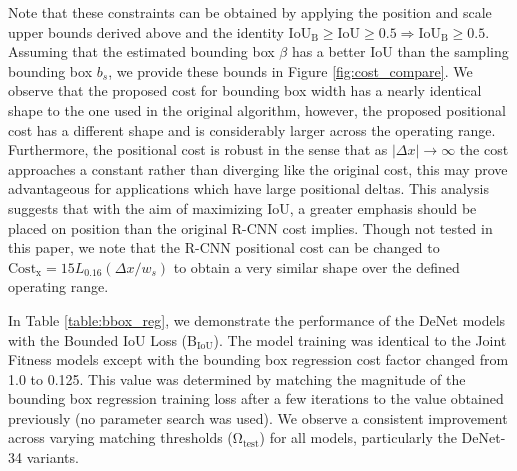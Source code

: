 \documentclass[10pt,twocolumn,letterpaper]{article}
\begin{document}
Note that these constraints can be obtained by applying the position and scale upper bounds derived above and the identity $\mathrm{IoU_B} \geq \mathrm{IoU} \geq 0.5 \Rightarrow \mathrm{IoU_B} \geq 0.5$. Assuming that the estimated bounding box $\beta$ has a better IoU than the sampling bounding box $b_s$, we provide these bounds in Figure \ref{fig:cost_compare}. We observe that the proposed cost for bounding box width has a nearly identical shape to the one used in the original algorithm, however, the proposed positional cost has a different shape and is considerably larger across the operating range. Furthermore, the positional cost is robust in the sense that as $|\Delta x| \rightarrow \infty$ the cost approaches a constant rather than diverging like the original cost, this may prove advantageous for applications which have large positional deltas. This analysis suggests that with the aim of maximizing IoU, a greater emphasis should be placed on position than the original R-CNN cost implies. Though not tested in this paper, we note that the R-CNN positional cost can be changed to $\mathrm{Cost_x} = 15 L_{0.16} \left (\Delta x / w_s  \right )$ to obtain a very similar shape over the defined operating range.

In Table \ref{table:bbox_reg}, we demonstrate the performance of the DeNet models with the Bounded IoU Loss ($\bm{\mathrm{B_{IoU}}}$). The model training was identical to the Joint Fitness models except with the bounding box regression cost factor changed from 1.0 to 0.125. This value was determined by matching the magnitude of the bounding box regression training loss after a few iterations to the value obtained previously (no parameter search was used). We observe a consistent improvement across varying matching thresholds ($\bm{\mathrm{\Omega_{test}}}$) for all models, particularly the DeNet-34 variants.
\end{document}

